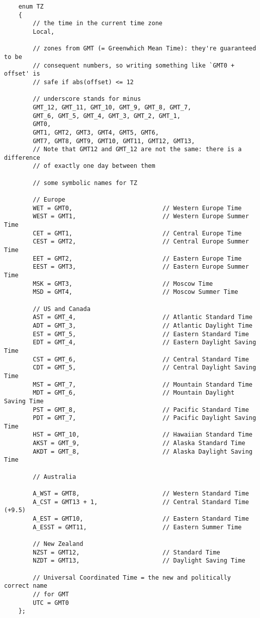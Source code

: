 \begin{verbatim}
    enum TZ
    {
        // the time in the current time zone
        Local,

        // zones from GMT (= Greenwhich Mean Time): they're guaranteed to be
        // consequent numbers, so writing something like `GMT0 + offset' is
        // safe if abs(offset) <= 12

        // underscore stands for minus
        GMT_12, GMT_11, GMT_10, GMT_9, GMT_8, GMT_7,
        GMT_6, GMT_5, GMT_4, GMT_3, GMT_2, GMT_1,
        GMT0,
        GMT1, GMT2, GMT3, GMT4, GMT5, GMT6,
        GMT7, GMT8, GMT9, GMT10, GMT11, GMT12, GMT13,
        // Note that GMT12 and GMT_12 are not the same: there is a difference
        // of exactly one day between them

        // some symbolic names for TZ

        // Europe
        WET = GMT0,                         // Western Europe Time
        WEST = GMT1,                        // Western Europe Summer Time
        CET = GMT1,                         // Central Europe Time
        CEST = GMT2,                        // Central Europe Summer Time
        EET = GMT2,                         // Eastern Europe Time
        EEST = GMT3,                        // Eastern Europe Summer Time
        MSK = GMT3,                         // Moscow Time
        MSD = GMT4,                         // Moscow Summer Time

        // US and Canada
        AST = GMT_4,                        // Atlantic Standard Time
        ADT = GMT_3,                        // Atlantic Daylight Time
        EST = GMT_5,                        // Eastern Standard Time
        EDT = GMT_4,                        // Eastern Daylight Saving Time
        CST = GMT_6,                        // Central Standard Time
        CDT = GMT_5,                        // Central Daylight Saving Time
        MST = GMT_7,                        // Mountain Standard Time
        MDT = GMT_6,                        // Mountain Daylight Saving Time
        PST = GMT_8,                        // Pacific Standard Time
        PDT = GMT_7,                        // Pacific Daylight Saving Time
        HST = GMT_10,                       // Hawaiian Standard Time
        AKST = GMT_9,                       // Alaska Standard Time
        AKDT = GMT_8,                       // Alaska Daylight Saving Time

        // Australia

        A_WST = GMT8,                       // Western Standard Time
        A_CST = GMT13 + 1,                  // Central Standard Time (+9.5)
        A_EST = GMT10,                      // Eastern Standard Time
        A_ESST = GMT11,                     // Eastern Summer Time

        // New Zealand
        NZST = GMT12,                       // Standard Time
        NZDT = GMT13,                       // Daylight Saving Time

        // Universal Coordinated Time = the new and politically correct name
        // for GMT
        UTC = GMT0
    };
\end{verbatim}

